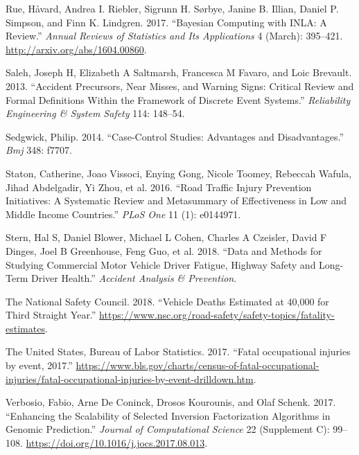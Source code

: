 \documentclass[12pt]{book}
\numberwithin{equation}{chapter}
\begin{document}
\leavevmode\hypertarget{ref-Rue2017}{}%
Rue, Håvard, Andrea I. Riebler, Sigrunn H. Sørbye, Janine B. Illian, Daniel P. Simpson, and Finn K. Lindgren. 2017. ``Bayesian Computing with INLA: A Review.'' \emph{Annual Reviews of Statistics and Its Applications} 4 (March): 395--421. \url{http://arxiv.org/abs/1604.00860}.

\leavevmode\hypertarget{ref-saleh2013accident}{}%
Saleh, Joseph H, Elizabeth A Saltmarsh, Francesca M Favaro, and Loic Brevault. 2013. ``Accident Precursors, Near Misses, and Warning Signs: Critical Review and Formal Definitions Within the Framework of Discrete Event Systems.'' \emph{Reliability Engineering \& System Safety} 114: 148--54.

\leavevmode\hypertarget{ref-sedgwick2014case}{}%
Sedgwick, Philip. 2014. ``Case-Control Studies: Advantages and Disadvantages.'' \emph{Bmj} 348: f7707.

\leavevmode\hypertarget{ref-staton2016road}{}%
Staton, Catherine, Joao Vissoci, Enying Gong, Nicole Toomey, Rebeccah Wafula, Jihad Abdelgadir, Yi Zhou, et al. 2016. ``Road Traffic Injury Prevention Initiatives: A Systematic Review and Metasummary of Effectiveness in Low and Middle Income Countries.'' \emph{PLoS One} 11 (1): e0144971.

\leavevmode\hypertarget{ref-stern2018data}{}%
Stern, Hal S, Daniel Blower, Michael L Cohen, Charles A Czeisler, David F Dinges, Joel B Greenhouse, Feng Guo, et al. 2018. ``Data and Methods for Studying Commercial Motor Vehicle Driver Fatigue, Highway Safety and Long-Term Driver Health.'' \emph{Accident Analysis \& Prevention}.

\leavevmode\hypertarget{ref-nsc2018}{}%
The National Safety Council. 2018. ``Vehicle Deaths Estimated at 40,000 for Third Straight Year.'' \url{https://www.nsc.org/road-safety/safety-topics/fatality-estimates}.

\leavevmode\hypertarget{ref-bols}{}%
The United States, Bureau of Labor Statistics. 2017. ``Fatal occupational injuries by event, 2017.'' \url{https://www.bls.gov/charts/census-of-fatal-occupational-injuries/fatal-occupational-injuries-by-event-drilldown.htm}.

\leavevmode\hypertarget{ref-Verbosio2017}{}%
Verbosio, Fabio, Arne De Coninck, Drosos Kourounis, and Olaf Schenk. 2017. ``Enhancing the Scalability of Selected Inversion Factorization Algorithms in Genomic Prediction.'' \emph{Journal of Computational Science} 22 (Supplement C): 99--108. \url{https://doi.org/10.1016/j.jocs.2017.08.013}.
\end{document}
